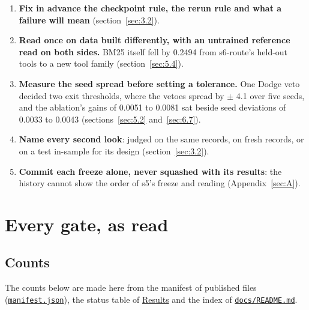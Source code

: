 \documentclass[10pt]{article}
\begin{document}
\begin{boxfloat}[!t]
{\begin{minipage}{\dimexpr\linewidth-2\fboxsep-2\fboxrule\relax}
\begin{enumerate}[leftmargin=1.6em,itemsep=1pt,topsep=3pt]
\item \textbf{Fix in advance the checkpoint rule, the rerun rule and what a failure will mean} (section~\ref{sec:3.2}).
\item \textbf{Read once on data built differently, with an untrained reference read on both sides.} BM25 itself fell by 0.2494 from s6-route's held-out tools to a new tool family (section~\ref{sec:5.4}).
\item \textbf{Measure the seed spread before setting a tolerance.} One Dodge veto decided two exit thresholds, where the vetoes spread by $\pm$ 4.1 over five seeds, and the ablation's gains of 0.0051 to 0.0081 sat beside seed deviations of 0.0033 to 0.0043 (sections~\ref{sec:5.2} and~\ref{sec:6.7}).
\item \textbf{Name every second look}: judged on the same records, on fresh records, or on a test in-sample for its design (section~\ref{sec:3.2}).
\item \textbf{Commit each freeze alone, never squashed with its results}: the history cannot show the order of s5's freeze and reading (Appendix~\ref{sec:A}).
\end{enumerate}
\end{minipage}}
\end{boxfloat}

\section{Every gate, as read}\label{sec:4}

\subsection{Counts}\label{sec:4.1}

The counts below are made here from the manifest of published files (\href{https://maxgfr.github.io/skycmd/models/manifest.json}{\texttt{manifest.json}}), the status table of \href{https://maxgfr.github.io/skycmd/results/\#status}{Results} and the index of \href{https://github.com/maxgfr/skycmd/blob/main/docs/README.md}{\texttt{docs/\allowbreak{}README.md}}.
\end{document}
